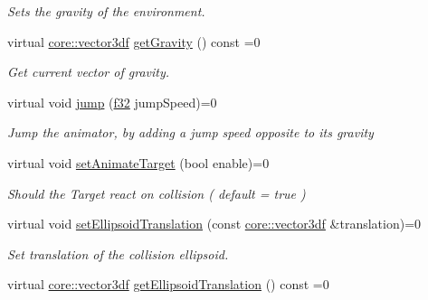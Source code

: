 \begin{DoxyCompactItemize}
\begin{DoxyCompactList}\small\item\em Sets the gravity of the environment. \end{DoxyCompactList}\item 
virtual \hyperlink{namespaceirr_1_1core_ae6e2b2a6c552833ebbd5b7463d03586b}{core\+::vector3df} \hyperlink{classirr_1_1scene_1_1ISceneNodeAnimatorCollisionResponse_a1b7c86e8948691ce00f2aa6253c5683a}{get\+Gravity} () const =0
\begin{DoxyCompactList}\small\item\em Get current vector of gravity. \end{DoxyCompactList}\item 
virtual void \hyperlink{classirr_1_1scene_1_1ISceneNodeAnimatorCollisionResponse_a409b98d04be89fb06cce3384e0188abf}{jump} (\hyperlink{namespaceirr_a0277be98d67dc26ff93b1a6a1d086b07}{f32} jump\+Speed)=0
\begin{DoxyCompactList}\small\item\em \textquotesingle{}Jump\textquotesingle{} the animator, by adding a jump speed opposite to its gravity \end{DoxyCompactList}\item 
\mbox{\label{classirr_1_1scene_1_1ISceneNodeAnimatorCollisionResponse_a402cbe4934ad10f18762001458c939d9}} 
virtual void \hyperlink{classirr_1_1scene_1_1ISceneNodeAnimatorCollisionResponse_a402cbe4934ad10f18762001458c939d9}{set\+Animate\+Target} (bool enable)=0
\begin{DoxyCompactList}\small\item\em Should the Target react on collision ( default = true ) \end{DoxyCompactList}\item 
virtual void \hyperlink{classirr_1_1scene_1_1ISceneNodeAnimatorCollisionResponse_a234ec747d320d70dd3e2a4143782ffc7}{set\+Ellipsoid\+Translation} (const \hyperlink{namespaceirr_1_1core_ae6e2b2a6c552833ebbd5b7463d03586b}{core\+::vector3df} \&translation)=0
\begin{DoxyCompactList}\small\item\em Set translation of the collision ellipsoid. \end{DoxyCompactList}\item 
virtual \hyperlink{namespaceirr_1_1core_ae6e2b2a6c552833ebbd5b7463d03586b}{core\+::vector3df} \hyperlink{classirr_1_1scene_1_1ISceneNodeAnimatorCollisionResponse_aff0a2ad6ff375a85e08a3226e3267286}{get\+Ellipsoid\+Translation} () const =0

\end{DoxyCompactItemize}
